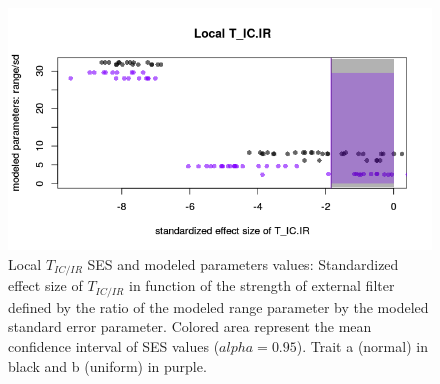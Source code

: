 \documentclass[12pt]{article}\usepackage[]{graphicx}\usepackage[]{color}
\makeatletter
\def\maxwidth{ %
  \ifdim\Gin@nat@width>\linewidth
    \linewidth
  \else
    \Gin@nat@width
  \fi
}
\newenvironment{knitrout}{}{} %
\makeatother
\begin{document}
\begin{knitrout}
\begin{figure}
{\centering \includegraphics[width=\maxwidth]{figure/Ex_filter_results_plot_modeledparam1-1} 

}

\caption[Local $T_{IC/IR}$ SES and modeled parameters values]{Local $T_{IC/IR}$ SES and modeled parameters values: Standardized effect size of $T_{IC/IR}$ in function of the strength of external filter defined by the ratio of the modeled range parameter by the modeled standard error parameter. Colored area represent the mean confidence interval of SES values ($alpha = 0.95$). Trait a (normal) in black and b (uniform) in purple.}\label{fig:Ex_filter_results_plot_modeledparam1}
\end{figure}


\end{knitrout}
\end{document}
